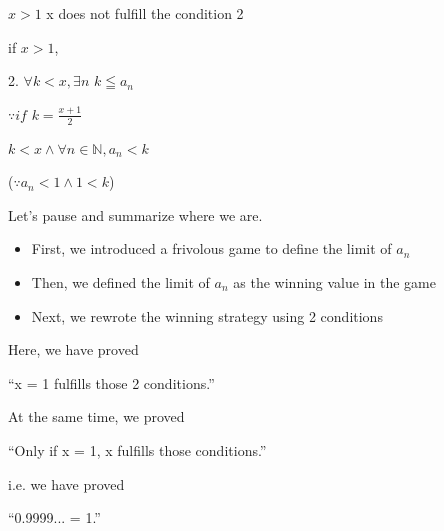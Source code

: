 \begin{frame}[c]{$x > 1$}{}
  x does not fulfill the condition 2

  if $x > 1$,

  2. $\forall k < x, \exists n$ $k \leqq a_n$

  \vspace{2ex}

  $\because if$ $k = \frac{x + 1}{2}$
  
  $k < x \land \forall n \in \mathbb{N}, a_n < k$

  ($\because a_n < 1 \land 1 < k$)
\end{frame}

\begin{frame}[c]{}{}
  Let's pause and summarize where we are.

  \vspace{2ex}

  \begin{itemize}
    \item First, we introduced a frivolous game to define the limit of $a_n$
    \item Then, we defined the limit of $a_n$ as the winning value in the game
    \item Next, we rewrote the winning strategy using 2 conditions
  \end{itemize}

\end{frame}

\begin{frame}[c]{}{}
  Here, we have proved

  \vspace{4ex}

  ``x = 1 fulfills those 2 conditions.''
\end{frame}

\begin{frame}[c]{}{}
  At the same time, we proved

  \vspace{4ex}

  ``Only if x = 1, x fulfills those conditions.''
\end{frame}

\begin{frame}[c]{}{}
  i.e. we have proved

  \vspace{4ex}

  ``0.9999... = 1.''
\end{frame}
